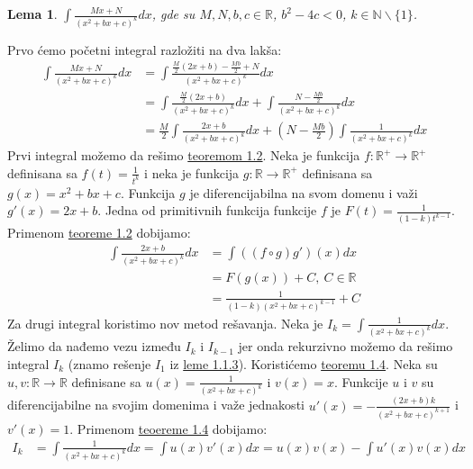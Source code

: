 \documentclass{article}
\newtheorem{lema}{Lema}[section]
\begin{document}
\begin{lemabox}
    \begin{lema}
        \label{lema_1.1.4}
        $\int \frac{Mx+N}{(x^2+bx+c)^k}dx$, gde su $M,N,b,c\in\mathbb{R}$, $b^2 - 4c < 0$, $k\in\mathbb{N}\backslash\{1\}$.
    \end{lema}
    Prvo ćemo početni integral razložiti na dva lakša:
    \begin{align*}
        \int \frac{Mx+N}{(x^2+bx+c)^k}dx & =\int \frac{\frac{M}{2}(2x+b)-\frac{Mb}{2}+N}{(x^2+bx+c)^k}dx                             \\
                                         & =\int \frac{\frac{M}{2}(2x+b)}{(x^2+bx+c)^k}dx+\int\frac{N-\frac{Mb}{2}}{(x^2+bx+c)^k}dx  \\
                                         & =\frac{M}{2}\int \frac{2x+b}{(x^2+bx+c)^k}dx+(N-\frac{Mb}{2})\int\frac{1}{(x^2+bx+c)^k}dx
    \end{align*}
    Prvi integral možemo da rešimo \hyperref[teorema_1.2]{teoremom 1.2}. Neka je
    funkcija $f: \mathbb{R}^{+}\longrightarrow\mathbb{R}^{+}$ definisana sa
    $f(t)=\frac{1}{t^k}$ i neka je funkcija $g: \mathbb{R}\longrightarrow\mathbb{R}^{+}$
    definisana sa $g(x)=x^2+bx+c$. Funkcija $g$ je diferencijabilna na svom domenu
    i važi $g'(x)=2x+b$. Jedna od primitivnih funkcija funkcije $f$ je $F(t)=\frac{1}{(1-k)t^{k-1}}$.
    Primenom \hyperref[teorema_1.2]{teoreme 1.2} dobijamo:
    \begin{align*}
        \int \frac{2x+b}{(x^2+bx+c)^k}dx & =\int((f\circ g)g')(x)dx           \\
                                         & =F(g(x))+C,\ C\in\mathbb{R}        \\
                                         & =\frac{1}{(1-k)(x^2+bx+c)^{k-1}}+C
    \end{align*}
    Za drugi integral koristimo nov metod rešavanja.
    Neka je $I_k=\int\frac{1}{(x^2+bx+c)^k}dx$. Želimo da nađemo vezu
    između $I_k$ i $I_{k-1}$ jer onda rekurzivno možemo da
    rešimo integral $I_k$ (znamo rešenje $I_1$ iz \hyperref[lema_1.1.3]{leme 1.1.3}). Koristićemo \hyperref[teorema_1.4]{teoremu 1.4}.
    Neka su $u,v:\mathbb{R}\longrightarrow\mathbb{R}$ definisane sa $u(x)=\frac{1}{(x^2+bx+c)^k}$
    i $v(x)=x$. Funkcije $u$ i $v$ su diferencijabilne na svojim domenima i
    važe jednakosti $u'(x)=-\frac{(2x+b)k}{(x^2+bx+c)^{k+1}}$ i $v'(x)=1$.
    Primenom \hyperref[teorema_1.4]{teoereme 1.4} dobijamo:
    \begin{align*}
        I_k       & =\int\frac{1}{(x^2+bx+c)^k}dx =\int u(x)v'(x)dx =u(x)v(x)-\int u'(x)v(x)dx                                       \\

\end{align*}
\end{lemabox}
\end{document}
